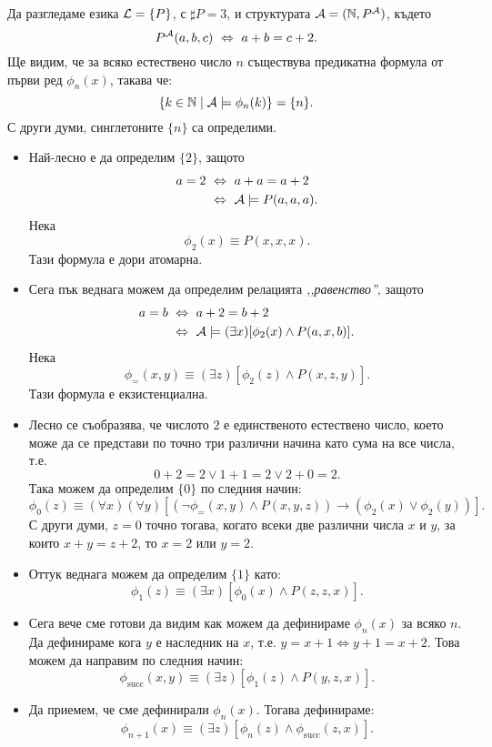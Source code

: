 \begin{example}
  Да разгледаме езика $\mathcal{L} = \{P\}$, с $\sharp P = 3$, и структурата $\mathcal{A} = (\mathbb{N}, P^{\mathcal{A}})$, където
  \[P^{\mathcal{A}}(a,b,c) \ \Leftrightarrow\  a + b = c+2.\]
  Ще видим, че за всяко естествено число $n$ съществува предикатна формула от първи ред $\phi_n(x)$, такава че:
  \[\{k \in \mathbb{N} \mid \mathcal{A} \models \phi_n(k)\} = \{n\}.\]
  С други думи, синглетоните $\{n\}$ са определими.

  \begin{itemize}
  \item
    Най-лесно е да определим $\{2\}$, защото 
    \begin{align*}
      a = 2 & \ \Leftrightarrow\  a + a = a + 2\\
            & \ \Leftrightarrow\  \mathcal{A} \models P(a,a,a).
    \end{align*}
    Нека \[\phi_2(x) \equiv P(x,x,x).\]
    Тази формула е дори атомарна.
  \item
    Сега пък веднага можем да определим релацията \emph{,,равенство''}, защото
    \begin{align*}
      a = b & \ \Leftrightarrow\  a + 2 = b + 2\\
            & \ \Leftrightarrow\  \mathcal{A} \models (\exists x)[ \phi_2(x) \land P(a,x,b)].
    \end{align*}
    Нека
    \[\phi_{=}(x,y) \equiv (\exists z)[ \phi_2(z) \land P(x,z,y)].\]
    Тази формула е екзистенциална.
  \item
    Лесно се съобразява, че числото $2$ е единственото естествено число, което
    може да се представи по точно три различни начина като сума на все числа, т.е.
    \[0 + 2 = 2 \lor 1 + 1 = 2 \lor 2+0 = 2.\]
    Така можем да определим $\{0\}$ по следния начин:
    \[\phi_0(z) \equiv (\forall x)(\forall y)[ (\neg \phi_{=}(x,y) \land P(x,y,z)) \to (\phi_2(x) \lor \phi_2(y))].\]
    С други думи, $z = 0$ точно тогава, когато всеки две различни числа $x$ и $y$, за които $x + y = z + 2$, то $x = 2$ или $y = 2$.
  \item
    Оттук веднага можем да определим $\{1\}$ като:
    \[\phi_{1}(z) \equiv (\exists x)[\phi_0(x) \land P(z,z,x)].\]
  \item
    Сега вече сме готови да видим как можем да дефинираме $\phi_n(x)$ за всяко $n$.
    Да дефинираме кога $y$ е наследник на $x$, т.е. 
    $y = x + 1 \iff y + 1 = x + 2$.
    Това можем да направим по следния начин:
    \[\phi_{\text{succ}}(x,y) \equiv (\exists z)[\phi_1(z) \land P(y,z,x)].\]
  \item
    Да приемем, че сме дефинирали $\phi_n(x)$. Тогава дефинираме:
    \[\phi_{n+1}(x) \equiv (\exists z)[\phi_n(z) \land \phi_{\text{succ}}(z,x)].\]

\end{itemize}
\end{example}
